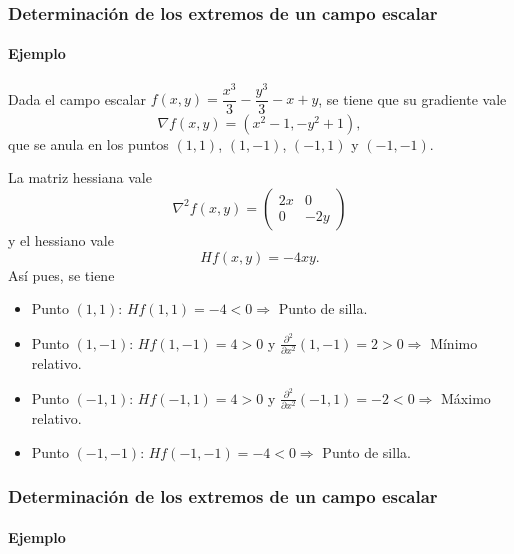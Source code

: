 \begin{frame}
	\frametitle{Determinación de los extremos de un campo escalar}
	\framesubtitle{Ejemplo}
	Dada el campo escalar $f(x,y)=\dfrac{x^3}{3}-\dfrac{y^3}{3}-x+y$, se tiene que su gradiente vale
	\[
		\nabla f(x,y)= (x^2-1,-y^2+1),
	\]
	que se anula en los puntos $(1,1)$, $(1,-1)$, $(-1,1)$ y $(-1,-1)$.
	
	La matriz hessiana vale 
	\[
		\nabla^2f(x,y) = \left(
		\begin{array}{cc}
			2x & 0   \\
			0  & -2y 
		\end{array}
		\right)
	\]
	y el hessiano vale
	\[
		Hf(x,y) = -4xy.
	\]
	Así pues, se tiene
	\begin{itemize}
		\item Punto $(1,1)$: $Hf(1,1)=-4<0 \Rightarrow$ Punto de silla.
		\item Punto $(1,-1)$: $Hf(1,-1)=4>0$ y $\frac{\partial^2}{\partial x^2}(1,-1)=2>0 \Rightarrow$ Mínimo relativo.
		\item Punto $(-1,1)$: $Hf(-1,1)=4>0$ y $\frac{\partial^2}{\partial x^2}(-1,1)=-2<0 \Rightarrow$ Máximo relativo.
		\item Punto $(-1,-1)$: $Hf(-1,-1)=-4<0 \Rightarrow$ Punto de silla.
	\end{itemize}
\end{frame}


\begin{frame}
	\frametitle{Determinación de los extremos de un campo escalar}
	\framesubtitle{Ejemplo}
	\begin{center}
		\scalebox{1}{}
	\end{center}
\end{frame}

